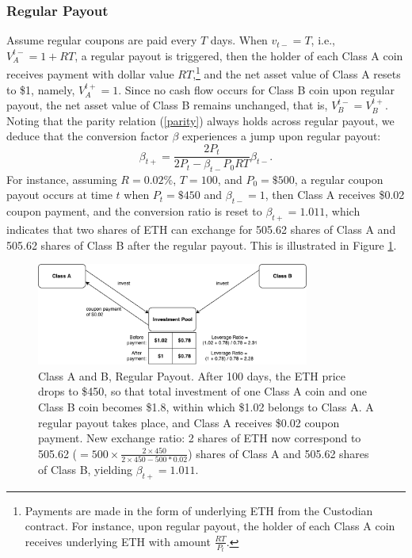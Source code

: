 \documentclass[11pt]{article}%
\numberwithin{equation}{section}
\theoremstyle{plain}
\begin{document}
\subsubsection{Regular Payout}
Assume regular coupons are paid every $T$ days. When $v_{t-}=T$, i.e., $V_{A}^{t-}=1+RT$, a regular payout is triggered, then the holder of each Class A coin receives payment with dollar value $RT$,\footnote{Payments are made in the form of underlying ETH from the Custodian contract. For instance, upon regular payout, the holder of each Class A coin receives underlying ETH with amount $\frac{RT}{P_{t}}$.}
 and the net asset value of Class A resets to \$1, namely, $V_{A}^{t+}=1$. Since no cash flow occurs for Class B coin upon regular payout, the net asset value of Class B remains unchanged, that is, $V_{B}^{t-}=V_{B}^{t+}$. Noting that the parity relation (\ref{parity}) always holds across regular payout, we deduce that the conversion factor $\beta$ experiences a jump upon regular payout:
 $$\beta_{t+}=\frac{2P_{t}}{2P_{t}-\beta_{t-}P_{0} RT}\beta_{t-}.$$
 For instance, assuming $R=0.02\%$, $T=100$, and $P_0=\$500$, a regular coupon payout occurs at time $t$ when $P_t=\$450$ and $\beta_{t-}=1$, then Class A receives \$0.02 coupon payment, and the conversion ratio is reset to $\beta_{t+}=1.011$, which indicates that two shares of ETH can exchange for 505.62 shares of Class A and 505.62 shares of Class B after the regular payout. This is illustrated in Figure \ref{fig:regular}.


\begin{figure}[!htb]
	\centering
	\includegraphics[width=0.8\textwidth]{periodic}
	\caption{Class A and B, Regular Payout. After 100 days, the ETH price drops to \$450, so that total investment of one Class A coin and one Class B coin becomes \$1.8, within which \$1.02 belongs to Class A. A regular payout takes place, and Class A receives \$0.02 coupon payment. New exchange ratio: 2 shares of ETH now correspond to 505.62 ($=500\times\frac{2\times450}{2\times450-500*0.02}$) shares of Class A and 505.62 shares of Class B, yielding $\beta_{t+}=1.011$.}\label{fig:regular}
\end{figure}
\end{document}
